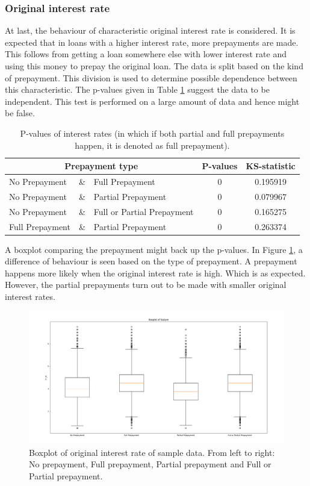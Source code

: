     \subsubsection{Original interest rate}
    At last, the behaviour of characteristic original interest rate is considered. It is expected that in loans with a higher interest rate, more prepayments are made. This follows from getting a loan somewhere else with lower interest rate and using this money to prepay the original loan. The data is split based on the kind of prepayment. This division is used to determine possible dependence between this characteristic. The p-values given in Table \ref{model_Pvals_of_int} suggest the data to be independent. This test is performed on a large amount of data and hence might be false. 
    \begin{table}[H]
        \centering
            \begin{tabular}{lcl|c|c}
            \multicolumn{3}{c|}{Prepayment type} & P-values& KS-statistic \\\hline
            No Prepayment & \& & Full Prepayment & 0 & 0.195919\\
            No Prepayment & \& & Partial Prepayment & 0 & 0.079967\\
            No Prepayment & \& & Full or Partial Prepayment & 0 & 0.165275 \\
            Full Prepayment & \& & Partial Prepayment & 0 & 0.263374
		    \end{tabular}
            \caption{P-values of interest rates (in which if both partial and full prepayments happen, it is denoted as full prepayment).}
	        \label{model_Pvals_of_int}
        \end{table}
        \noindent
        A boxplot comparing the prepayment might back up the p-values. In Figure \ref{model_boxplot_int_rt}, a difference of behaviour is seen based on the type of prepayment. A prepayment happens more likely when the original interest rate is high. Which is as expected. However, the partial prepayments turn out to be made with smaller original interest rates. 
        \begin{figure}[H]
            \centering
            \includegraphics[width=\linewidth]{Latex/Report/Figures/Boxplot_of_int_rt_[2013, 2014, 2015, 2016, 2017, 2018, 2019, 2020]_.png}
            \caption{Boxplot of original interest rate of sample data. From left to right: No prepayment, Full prepayment, Partial prepayment and Full or Partial prepayment.}
            \label{model_boxplot_int_rt}
        \end{figure}
